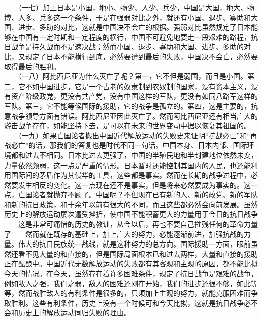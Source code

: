 \documentclass[cn,11pt,chinese]{elegantbook}
\begin{document}
　　（一七）加上日本是小国，地小、物少、人少、兵少，中国是大国，地大、物博、人多、兵多这一个条件，于是在强弱对比之外，就还有小国、退步、寡助和大国、进步、多助的对比，这就是中国决不会亡的根据。强弱对比虽然规定了日本能够在中国有一定时期和一定程度的横行，中国不可避免地要走一段艰难的路程，抗日战争是持久战而不是速决战；然而小国、退步、寡助和大国、进步、多助的对比，又规定了日本不能横行到底，必然要遭到最后的失败，中国决不会亡，必然要取得最后的胜利。\\
　　（一八）阿比西尼亚为什么灭亡了呢？第一，它不但是弱国，而且是小国。第二，它不如中国进步，它是一个古老的奴隶制到农奴制的国家，没有资本主义，没有资产阶级政党，更没有共产党，没有中国这样的军队，更没有如同八路军这样的军队。第三，它不能等候国际的援助，它的战争是孤立的。第四，这是主要的，抗意战争领导方面有错误。阿比西尼亚因此灭亡了。然而阿比西尼亚还有相当广大的游击战争存在，如能坚持下去，是可以在未来的世界变动中据以恢复其祖国的。\\
　　（一九）如果亡国论者搬出中国近代解放运动的失败史来证明“抗战必亡”和“再战必亡”的话，那我们的答复也是时代不同一句话。中国本身、日本内部、国际环境都和过去不相同。日本比过去更强了，中国的半殖民地和半封建地位依然未变，力量依然颇弱，这一点是严重的情形。日本暂时还能控制其国内的人民，也还能利用国际间的矛盾作为其侵华的工具，这些都是事实。然而在长期的战争过程中，必然要发生相反的变化。这一点现在还不是事实，但是将来必然要成为事实的。这一点，亡国论者就抛弃不顾了。中国呢？不但现在已有新的人、新的政党、新的军队和新的抗日政策，和十余年以前有很大的不同，而且这些都必然会向前发展。虽然历史上的解放运动屡次遭受挫折，使中国不能积蓄更大的力量用于今日的抗日战争——这是非常可痛惜的历史的教训，从今以后，再也不要自己摧残任何的革命力量了——然而就在既存的基础上，加上广大的努力，必能逐渐前进，加强抗战的力量。伟大的抗日民族统一战线，就是这种努力的总方向。国际援助一方面，眼前虽然还看不见大量的和直接的，但是国际局面根本已和过去两样，大量和直接的援助正在酝酿中。中国近代无数解放运动的失败都有其客观和主观的原因，都不能比拟今天的情况。在今天，虽然存在着许多困难条件，规定了抗日战争是艰难的战争，例如敌人之强，我们之弱，敌人的困难还刚在开始，我们的进步还很不够，如此等等，然而战胜敌人的有利条件是很多的，只须加上主观的努力，就能克服困难而争取胜利。这些有利条件，历史上没有一个时候可和今天比拟，这就是抗日战争必不会和历史上的解放运动同归失败的理由。\\
\end{document}
